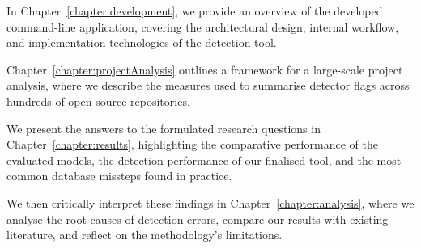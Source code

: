 In Chapter~\ref{chapter:development}, we provide an overview of the developed command-line application, covering the architectural design, internal workflow, and implementation technologies of the detection tool.

Chapter~\ref{chapter:projectAnalysis} outlines a framework for a large-scale project analysis, where we describe the measures used to summarise detector flags across hundreds of open-source repositories.

We present the answers to the formulated research questions in Chapter~\ref{chapter:results}, highlighting the comparative performance of the evaluated models, the detection performance of our finalised tool, and the most common database missteps found in practice.

We then critically interpret these findings in Chapter~\ref{chapter:analysis}, where we analyse the root causes of detection errors, compare our results with existing literature, and reflect on the methodology's limitations.
